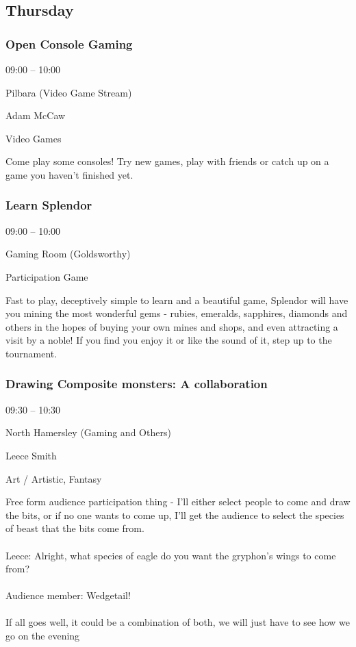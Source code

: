 \documentclass{scrreprt}
\begin{document}
\begin{multicols}{2}
\subsection*{Thursday}\subsubsection*{Open Console Gaming}\begin{description}
\setlength{\itemsep}{0pt}
\setlength{\parsep}{0pt}
\setlength{\parskip}{0pt}
\item[Time:]{09:00 -- 10:00}
\item[Venue:]{Pilbara (Video Game Stream)}
\item[People:]{Adam McCaw}
\item[Tags:]{Video Games}\end{description}
Come play some consoles! Try new games, play with friends or catch up on a game you haven't finished yet.
\subsubsection*{Learn Splendor}\begin{description}
\setlength{\itemsep}{0pt}
\setlength{\parsep}{0pt}
\setlength{\parskip}{0pt}
\item[Time:]{09:00 -- 10:00}
\item[Venue:]{Gaming Room (Goldsworthy)}
\item[Tags:]{Participation Game}\end{description}
Fast to play, deceptively simple to learn and a beautiful game, Splendor will have you mining the most wonderful gems - rubies, emeralds, sapphires, diamonds and others in the hopes of buying your own mines and shops, and even attracting a visit by a noble! If you find you enjoy it or like the sound of it, step up to the tournament.
\subsubsection*{Drawing Composite monsters: A collaboration}\begin{description}
\setlength{\itemsep}{0pt}
\setlength{\parsep}{0pt}
\setlength{\parskip}{0pt}
\item[Time:]{09:30 -- 10:30}
\item[Venue:]{North Hamersley (Gaming and Others)}
\item[People:]{Leece Smith}
\item[Tags:]{Art / Artistic, Fantasy}\end{description}
Free form audience participation thing - I'll either select people to come and draw the bits, or if no one wants to come up, I'll get the audience to select the species of beast that the bits come from.\\\\Leece: Alright, what species of eagle do you want the gryphon's wings to come from? \\\\Audience member: Wedgetail!\\\\If all goes well, it could be a combination of both, we will just have to see how we go on the evening

\end{multicols}
\end{document}
